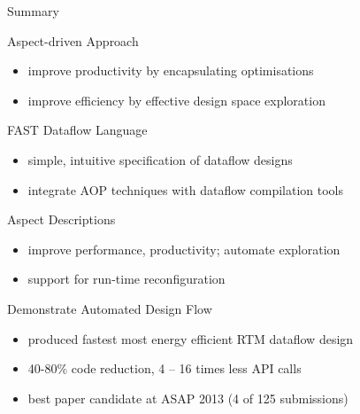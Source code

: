 \begin{frame}{Summary}

  \begin{beamerboxesrounded}{Aspect-driven Approach}
    \begin{itemize}
    \item improve productivity by encapsulating optimisations
    \item improve efficiency by effective design space exploration
    \end{itemize}
  \end{beamerboxesrounded}

  \begin{beamerboxesrounded}{FAST Dataflow Language}
    \begin{itemize}
    \item simple, intuitive specification of dataflow designs
    \item integrate AOP techniques with dataflow compilation tools
    \end{itemize}
  \end{beamerboxesrounded}

  \begin{beamerboxesrounded}{Aspect Descriptions}
    \begin{itemize}
      \item improve performance, productivity; automate exploration
      \item support for run-time reconfiguration
    \end{itemize}
  \end{beamerboxesrounded}

  \begin{beamerboxesrounded}{Demonstrate Automated Design Flow}
    \begin{itemize}
    \item produced fastest most energy efficient  RTM dataflow design
    \item 40-80\% code reduction, 4 -- 16 times less API calls
    \item best paper candidate at ASAP 2013 (4 of 125 submissions)
    \end{itemize}
  \end{beamerboxesrounded}

\end{frame}
